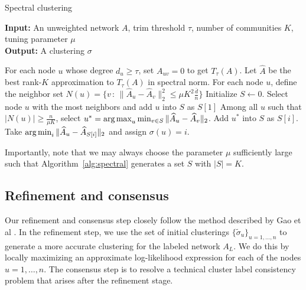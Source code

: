 \begin{algorithm}[h!]
\caption{Spectral clustering}
\label{alg:spectral}
\textbf{Input:} An unweighted network $A$, trim threshold $\tau$, number of communities $K$, tuning parameter $\mu$ \\
\textbf{Output:} A clustering $\sigma$ \\

\begin{algorithmic}[1]
\State For each node $u$ whose degree $d_u \geq \tau$, set $A_{uv} = 0$ to get $T_{\tau}(A)$. 
\State Let $\hat{A}$ be the best rank-$K$ approximation to $T_{\tau}(A)$ in spectral norm.
\State For each node $u$, define the neighbor set $N(u) = \{ v \,:\, \| \hat{A}_u - \hat{A}_v \|_2^2 \leq \mu K^2 \frac{\bar{d}}{n} \}$
\State Initialize $S \leftarrow 0$. Select node $u$ with the most neighbors and add $u$ into $S$ as $S[1]$
    \State Among all $u$ such that $|N(u)| \geq \frac{n}{\mu K}$, select 
           $u^* = \mathop{\text{\rm arg\,max}}_u \min_{v \in S} \| \widehat{A}_u - \widehat{A}_v \|_2$.
    \State Add $u^*$ into $S$ as $S[i]$.
\EndFor
{}
    \State Take $\mathop{\text{\rm arg\,min}}_i \| \widehat{A}_u - \widehat{A}_{S[i]} \|_2$ and assign $\sigma(u) = i$.
\EndFor
\end{algorithmic}
\end{algorithm}

Importantly, note that we may always choose the parameter $\mu$ sufficiently large such that Algorithm~\ref{alg:spectral} generates a set $S$ with $|S| = K$.

\subsection{Refinement and consensus}

Our refinement and consensus step closely follow the method described by Gao et al \cite{gao2015achieving}. In the refinement step, we use the set of initial clusterings $\{\tilde{\sigma}_u\}_{u=1, \dots, n}$ to generate a more accurate clustering for the labeled network $A_L$. We do this by locally maximizing an approximate log-likelihood expression for each of the nodes $u=1, \dots, n$. The consensus step is to resolve a technical cluster label consistency problem that arises after the refinement stage. 

